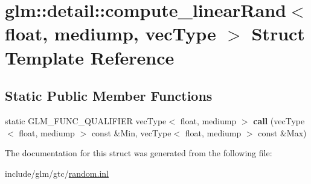 \hypertarget{structglm_1_1detail_1_1compute__linearRand_3_01float_00_01mediump_00_01vecType_01_4}{}\section{glm\+:\+:detail\+:\+:compute\+\_\+linear\+Rand$<$ float, mediump, vec\+Type $>$ Struct Template Reference}
\label{structglm_1_1detail_1_1compute__linearRand_3_01float_00_01mediump_00_01vecType_01_4}
\subsection*{Static Public Member Functions}
\begin{DoxyCompactItemize}
\item 
\mbox{\label{structglm_1_1detail_1_1compute__linearRand_3_01float_00_01mediump_00_01vecType_01_4_a9202e17262bd8b1ffb9804bf681e1d49}} 
static G\+L\+M\+\_\+\+F\+U\+N\+C\+\_\+\+Q\+U\+A\+L\+I\+F\+I\+ER vec\+Type$<$ float, mediump $>$ {\bfseries call} (vec\+Type$<$ float, mediump $>$ const \&Min, vec\+Type$<$ float, mediump $>$ const \&Max)
\end{DoxyCompactItemize}


The documentation for this struct was generated from the following file\+:\begin{DoxyCompactItemize}
\item 
include/glm/gtc/\hyperlink{random_8inl}{random.\+inl}\end{DoxyCompactItemize}
